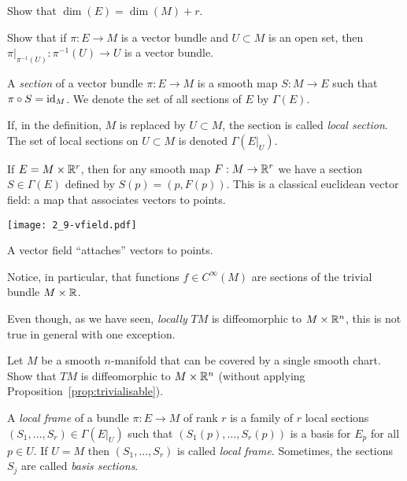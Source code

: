 \begin{exercise}
  Show that $\dim(E) = \dim(M) + r$.
\end{exercise}
\begin{exercise}
  Show that if $\pi:E\to M$ is a vector bundle and $U\subset M$ is an open set, then $\pi\big|_{\pi^{-1}(U)}: \pi^{-1}(U) \to U$ is a vector bundle.
\end{exercise}

\begin{definition}
  A \emph{section} of a vector bundle $\pi:E \to M$ is a smooth map $S:M \to E$ such that $\pi\circ S = \operatorname{id}_M$. We denote the set of all sections of $E$ by $\Gamma(E)$.
  
  If, in the definition, $M$ is replaced by $U\subset M$, the section is called \emph{local section}. The set of local sections on $U\subset M$ is denoted $\Gamma(E|_U)$.
\end{definition}

\begin{example}
  If $E = M\times \mathbb{R}^r$, then for any smooth map $F: M\to\mathbb{R}^r$ we have a section $S\in\Gamma(E)$ defined by $S(p) = (p, F(p))$. This is a classical euclidean vector field: a map that associates vectors to points.
  \begin{marginfigure}
    \texttt{[image: 2\_9-vfield.pdf]}
    \caption{A vector field ``attaches'' vectors to points.}
  \end{marginfigure}
  Notice, in particular, that functions $f\in C^\infty(M)$ are sections of the trivial bundle $M\times\mathbb{R}$.
\end{example}

Even though, as we have seen, \emph{locally} $TM$ is diffeomorphic to $M\times\mathbb{R}^n$, this is not true in general with one exception.
\begin{exercise}\label{ex:trivialisable}
  Let $M$ be a smooth $n$-manifold that can be covered by a single smooth chart.
  Show that $TM$ is diffeomorphic to $M\times\mathbb{R}^n$ (without applying Proposition~\ref{prop:trivialisable}).
\end{exercise}

\begin{definition}
  A \emph{local frame} of a bundle $\pi:E\to M$ of rank $r$ is a family of $r$ local sections $(S_1, \ldots, S_r)\in\Gamma(E|_U)$ such that $(S_1(p), \ldots, S_r(p))$ is a basis for $E_p$ for all $p\in U$.
  If $U=M$ then $(S_1, \ldots, S_r)$ is called \emph{local frame}.
  Sometimes, the sections $S_j$ are called \emph{basis sections}.
\end{definition}

